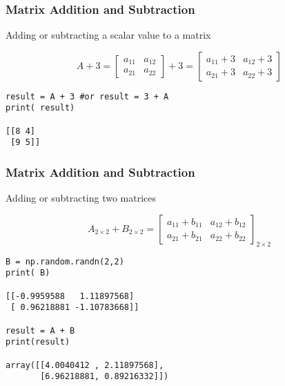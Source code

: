  \begin{frame}[fragile] \frametitle{Matrix Addition and Subtraction}

Adding or subtracting a scalar value to a matrix

\begin{equation}
    A+3=\begin{bmatrix}
      a_{11} & a_{12} \\
      a_{21} & a_{22}   
    \end{bmatrix}+3
    =\begin{bmatrix}
      a_{11}+3 & a_{12}+3 \\
      a_{21}+3 & a_{22}+3   
    \end{bmatrix}
\end{equation}


\begin{lstlisting}
result = A + 3 #or result = 3 + A
print( result)

[[8 4]
 [9 5]]
\end{lstlisting}

\end{frame}

 \begin{frame}[fragile] \frametitle{Matrix Addition and Subtraction}

Adding or subtracting two matrices

\begin{equation}
A_{2 \times 2} + B_{2 \times 2}= \begin{bmatrix}
  a_{11}+b_{11} & a_{12}+b_{12} \\
  a_{21}+b_{21} & a_{22}+b_{22}     
\end{bmatrix}_{2 \times 2}
\end{equation}


\begin{lstlisting}
B = np.random.randn(2,2)
print( B)

[[-0.9959588   1.11897568]
 [ 0.96218881 -1.10783668]]
 
result = A + B
print(result)

array([[4.0040412 , 2.11897568],
       [6.96218881, 0.89216332]])
\end{lstlisting}

\end{frame}

